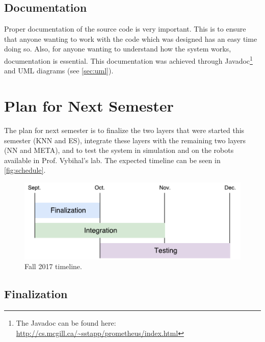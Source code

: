 \documentclass[titlepage,11pt]{article}
\begin{document}
\subsection{Documentation}

Proper documentation of the source code is very important. This is to ensure that anyone wanting to work with the code which was designed has an easy time doing so. Also, for anyone wanting to understand how the system works, documentation is essential. This documentation was achieved through Javadoc\footnote{The Javadoc can be found here: \url{http://cs.mcgill.ca/~sstapp/prometheus/index.html}} and UML diagrams (see \autoref{sec:uml}).


\section{Plan for Next Semester}
\label{sec:plan}

The plan for next semester is to finalize the two layers that were started this semester (KNN and ES), integrate these layers with the remaining two layers (NN and META), and to test the system in simulation and on the robots available in Prof. Vybihal's lab. The expected timeline can be seen in \autoref{fig:schedule}.

\begin{figure}[!htb]
	\includegraphics[width=\columnwidth]{figures/schedule.pdf}
	\caption
	{Fall 2017 timeline.}
	\label{fig:schedule}
\end{figure}

\subsection{Finalization}
\end{document}
